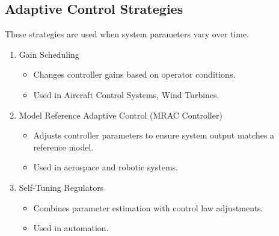 \documentclass{article}
\begin{document}
\subsection{Adaptive Control Strategies}
These strategies are used when system parameters vary over time.
\begin{enumerate}
    \item Gain Scheduling
        \begin{itemize}
            \item Changes controller gains based on operator conditions.
            \item Used in Aircraft Control Systems, Wind Turbines.
        \end{itemize}
    \item Model Reference Adaptive Control (MRAC Controller)
        \begin{itemize}
            \item Adjusts controller parameters to ensure system output matches a reference model.
            \item Used in aerospace and robotic systems.
        \end{itemize}
    \item Self-Tuning Regulators
        \begin{itemize}
            \item Combines parameter estimation with control law adjustments.
            \item Used in automation.
        \end{itemize}
\end{enumerate}
\end{document}

